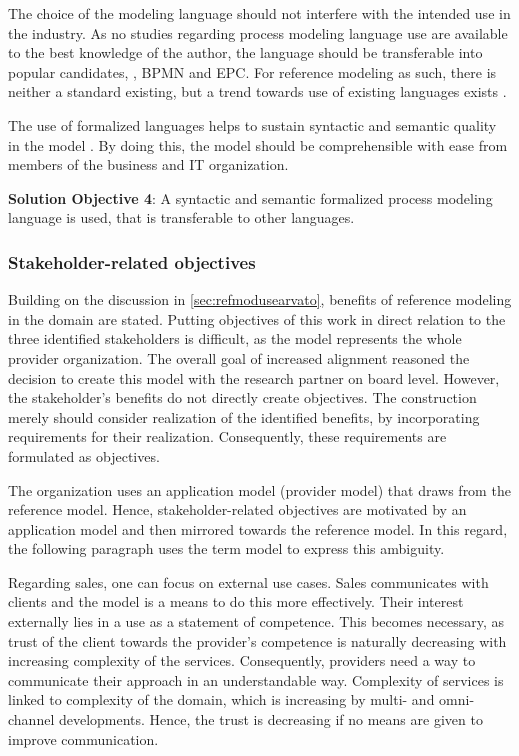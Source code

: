 The choice of the modeling language should not interfere with the intended use in the industry. As no studies regarding process modeling language use are available to the best knowledge of the author, the language should be transferable into popular candidates, \eg, \acrshort{BPMN} and \acrshort{EPC}. For reference modeling as such, there is neither a standard existing, but a trend towards use of existing languages exists \citep{Fettke2004}. 

The use of formalized languages helps to sustain syntactic and semantic quality in the model \citep{Fettke2004}. By doing this, the model should be comprehensible with ease from members of the business and IT organization. 

\hfill\begin{minipage}{\dimexpr\textwidth-1.2cm}
	\textbf{Solution Objective 4}: A syntactic and semantic formalized process modeling language is used, that is transferable to other languages. 
	
\end{minipage}

\subsubsection{Stakeholder-related objectives}

Building on the discussion in \ref{sec:refmodusearvato}, benefits of reference modeling in the domain are stated. Putting objectives of this work in direct relation to the three identified stakeholders is difficult, as the model represents the whole provider organization. The overall goal of increased alignment reasoned the decision to create this model with the research partner on board level. However, the stakeholder's benefits do not directly create objectives. The construction merely should consider realization of the identified benefits, by incorporating requirements for their realization.  Consequently, these requirements are formulated as objectives.  

The organization uses an application model (provider model) that draws from the reference model. Hence, stakeholder-related objectives are motivated by an application model and then mirrored towards the reference model. In this regard, the following paragraph uses the term model to express this ambiguity. 

Regarding sales, one can focus on external use cases. Sales communicates with clients and the model is a means to do this more effectively. Their interest externally lies in a use as a statement of competence. This becomes necessary, as trust of the client towards the provider's competence is naturally decreasing with increasing complexity of the services. Consequently, providers need a way to communicate their approach in an understandable way. Complexity of services is linked to complexity of the domain, which is increasing by multi- and omni-channel developments. Hence, the trust is decreasing if no means are given to improve communication. 


